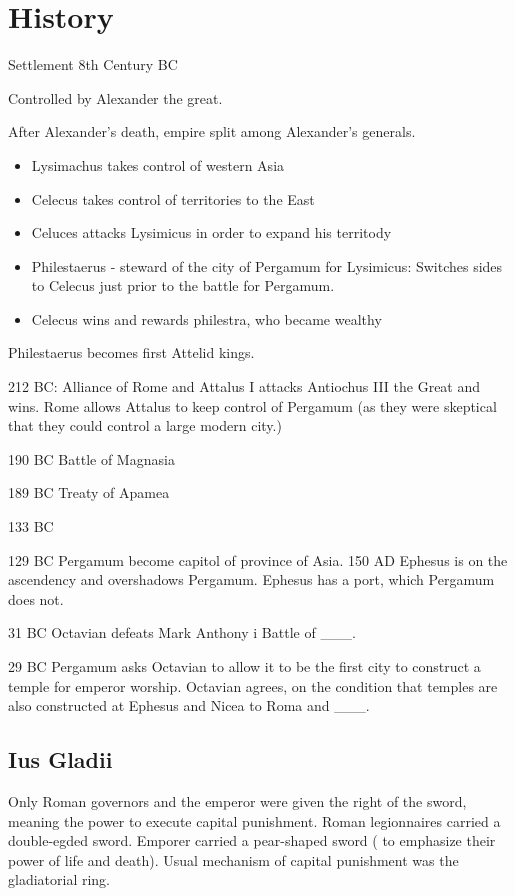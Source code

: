 \documentclass[
]{book}
\providecommand{\tightlist}{%
  \setlength{\itemsep}{0pt}\setlength{\parskip}{0pt}}
\begin{document}
\hypertarget{history-4}{%
\section{History}\label{history-4}}

Settlement 8th Century BC

Controlled by Alexander the great.

After Alexander's death, empire split among Alexander's generals.

\begin{itemize}
\tightlist
\item
  Lysimachus takes control of western Asia
\item
  Celecus takes control of territories to the East
\item
  Celuces attacks Lysimicus in order to expand his territody
\item
  Philestaerus - steward of the city of Pergamum for Lysimicus: Switches sides to Celecus just prior to the battle for Pergamum.
\item
  Celecus wins and rewards philestra, who became wealthy
\end{itemize}

Philestaerus becomes first Attelid kings.

212 BC: Alliance of Rome and Attalus I attacks Antiochus III the Great and wins. Rome allows Attalus to keep control of Pergamum (as they were skeptical that they could control a large modern city.)

190 BC Battle of Magnasia

189 BC Treaty of Apamea

133 BC

129 BC Pergamum become capitol of province of Asia. 150 AD Ephesus is on the ascendency and overshadows Pergamum. Ephesus has a port, which Pergamum does not.

31 BC Octavian defeats Mark Anthony i Battle of \_\_\_.

29 BC Pergamum asks Octavian to allow it to be the first city to construct a temple for emperor worship. Octavian agrees, on the condition that temples are also constructed at Ephesus and Nicea to Roma and \_\_\_.

\hypertarget{ius-gladii}{%
\subsection{Ius Gladii}\label{ius-gladii}}

Only Roman governors and the emperor were given the right of the sword, meaning the power to execute capital punishment. Roman legionnaires carried a double-egded sword. Emporer carried a pear-shaped sword ( to emphasize their power of life and death). Usual mechanism of capital punishment was the gladiatorial ring.
\end{document}

